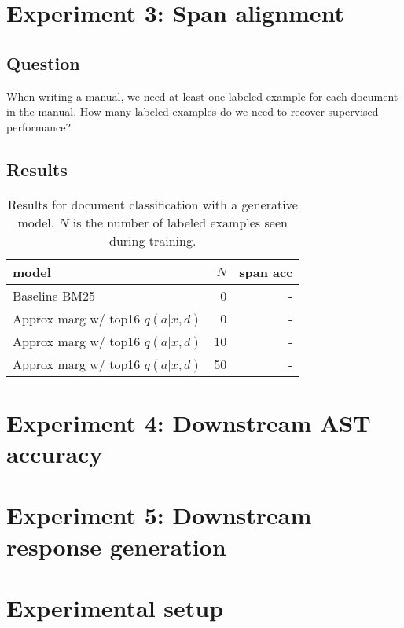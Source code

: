 \documentclass[11pt]{article}
\begin{document}
\section{Experiment 3: Span alignment}
\subsection{Question}
When writing a manual, we need at least one labeled example for each document in the manual.
How many labeled examples do we need to recover supervised performance?


\subsection{Results}
\begin{table}
\centering
\begin{tabular}{lrr}
\toprule
model & $N$ & span acc\\
\midrule
Baseline BM25 & 0 & -\\
Approx marg w/ top16 $q(a|x,d)$ & 0 & -\\
Approx marg w/ top16 $q(a|x,d)$ & 10 & -\\
Approx marg w/ top16 $q(a|x,d)$ & 50 & -\\
\bottomrule
\end{tabular}
\caption{
\label{tbl:unsup-span}
Results for document classification with a generative model.
$N$ is the number of labeled examples seen during training.}
\end{table}

\section{Experiment 4: Downstream AST accuracy}

\section{Experiment 5: Downstream response generation}

\section{Experimental setup}
\end{document}
